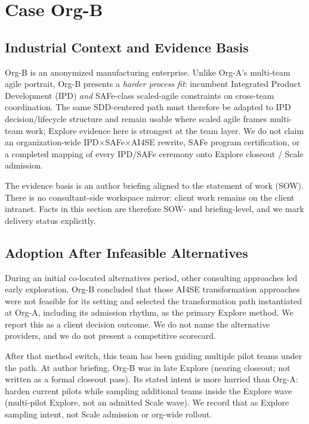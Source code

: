 \documentclass[10pt,conference]{IEEEtran}
\begin{document}
\section{Case Org-B}
\label{sec:org-b}

\subsection{Industrial Context and Evidence Basis}

Org-B is an anonymized manufacturing enterprise.
Unlike Org-A's multi-team agile portrait, Org-B presents a \emph{harder process
fit}: incumbent Integrated Product Development (IPD) \emph{and} SAFe-class
scaled-agile constraints on cross-team coordination.
The same SDD-centered path must therefore be adapted to IPD
decision/lifecycle structure and remain usable where scaled agile frames
multi-team work; Explore evidence here is strongest at the team layer.
We do not claim an organization-wide IPD$\times$SAFe$\times$AI4SE rewrite, SAFe
program certification, or a completed mapping of every IPD/SAFe ceremony onto
Explore closeout / Scale admission.

The evidence basis is an author briefing aligned to the statement of work
(SOW).
There is no consultant-side workspace mirror: client work remains on the
client intranet.
Facts in this section are therefore SOW- and briefing-level, and we mark
delivery status explicitly.

\subsection{Adoption After Infeasible Alternatives}

During an initial co-located alternatives period, other consulting approaches
led early exploration.
Org-B concluded that those AI4SE transformation approaches were not feasible
for its setting and selected the transformation path instantiated at Org-A,
including its admission rhythm, as the primary Explore method.
We report this as a client decision outcome.
We do not name the alternative providers, and we do not present a competitive
scorecard.

After that method switch, this team has been guiding multiple pilot teams
under the path.
At author briefing, Org-B was in late Explore (nearing closeout; not written
as a formal closeout pass).
Its stated intent is more hurried than Org-A: harden current pilots while
sampling additional teams inside the Explore wave (multi-pilot Explore, not an
admitted Scale wave).
We record that as Explore sampling intent, not Scale admission or org-wide
rollout.
\end{document}
